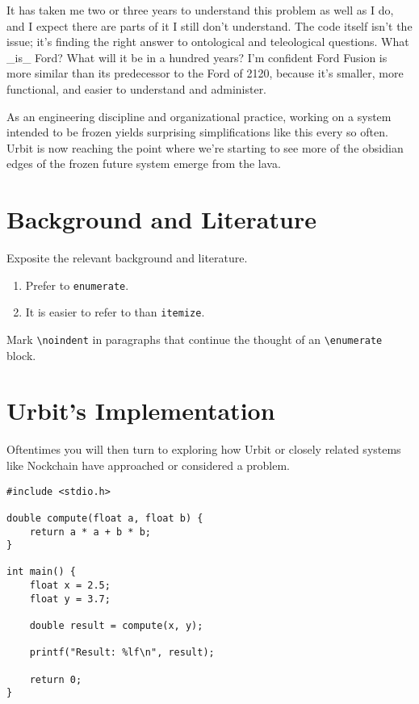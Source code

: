 \documentclass[twoside]{article}
\begin{document}
It has taken me two or three years to understand this problem as well as I do, and I expect there are parts of it I still don’t understand. The code itself isn’t the issue; it’s finding the right answer to ontological and teleological questions. What _is_ Ford? What will it be in a hundred years? I’m confident Ford Fusion is more similar than its predecessor to the Ford of 2120, because it’s smaller, more functional, and easier to understand and administer.

As an engineering discipline and organizational practice, working on a system intended to be frozen yields surprising simplifications like this every so often. Urbit is now reaching the point where we’re starting to see more of the obsidian edges of the frozen future system emerge from the lava.
\section{Background and Literature}

Exposite the relevant background and literature.

\begin{enumerate}
  \item  Prefer to \texttt{enumerate}.
  \item  It is easier to refer to than \texttt{itemize}.
\end{enumerate}

\noindent
Mark \texttt{\textbackslash noindent} in paragraphs that continue the thought of an \texttt{\textbackslash enumerate} block.

\section{Urbit's Implementation}

Oftentimes you will then turn to exploring how Urbit or closely related systems like Nockchain have approached or considered a problem.

\lstset{language=C}
\begin{lstlisting}
#include <stdio.h>

double compute(float a, float b) {
    return a * a + b * b;
}

int main() {
    float x = 2.5;
    float y = 3.7;

    double result = compute(x, y);

    printf("Result: %lf\n", result);

    return 0;
}
\end{lstlisting}
\end{document}
